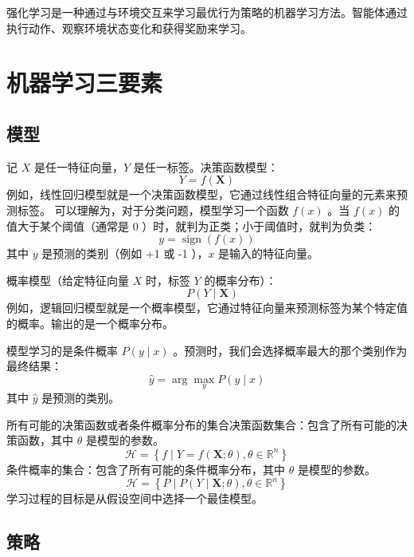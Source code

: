 \begin{definition}[强化学习]
    强化学习是一种通过与环境交互来学习最优行为策略的机器学习方法。智能体通过执行动作、观察环境状态变化和获得奖励来学习。
\end{definition}

\section{机器学习三要素}

\subsection{模型}

\begin{definition}[决策函数模型]
    记 $X$ 是任一特征向量，$Y$ 是任一标签。决策函数模型：
    $$Y=f(\mathbf{X})$$
    例如，线性回归模型就是一个决策函数模型，它通过线性组合特征向量的元素来预测标签。
    可以理解为，对于分类问题，模型学习一个函数 $f(x)$ 。当 $f(x)$ 的值大于某个阈值（通常是 0 ）时，就判为正类；小于阈值时，就判为负类：
    $$
        y=\operatorname{sign}(f(x))
    $$
    其中 $y$ 是预测的类别（例如 +1 或 -1 ），$x$ 是输入的特征向量。
\end{definition}

\begin{definition}[概率模型]
    概率模型（给定特征向量 $X$ 时，标签 $Y$ 的概率分布）：
    $$\quad P(Y \mid \mathbf{X})$$
    例如，逻辑回归模型就是一个概率模型，它通过特征向量来预测标签为某个特定值的概率。输出的是一个概率分布。

    模型学习的是条件概率 $P(y \mid x)$ 。预测时，我们会选择概率最大的那个类别作为最终结果：
    $$
        \hat{y}=\arg \max _y P(y \mid x)
    $$
    其中 $\hat{y}$ 是预测的类别。
\end{definition}

\begin{definition}[假设空间]
    所有可能的决策函数或者条件概率分布的集合决策函数集合：包含了所有可能的决策函数，其中 $\theta$ 是模型的参数。
    $$\mathcal{H}=\left\{f \mid Y=f(\mathbf{X} ; \theta), \theta \in \mathbb{R}^n\right\}$$
    条件概率的集合：包含了所有可能的条件概率分布，其中 $\theta$ 是模型的参数。
    $$\mathcal{H}=\left\{P \mid P(Y \mid \mathbf{X} ; \theta), \theta \in \mathbb{R}^n\right\}$$
    学习过程的目标是从假设空间中选择一个最佳模型。
\end{definition}

\subsection{策略}

